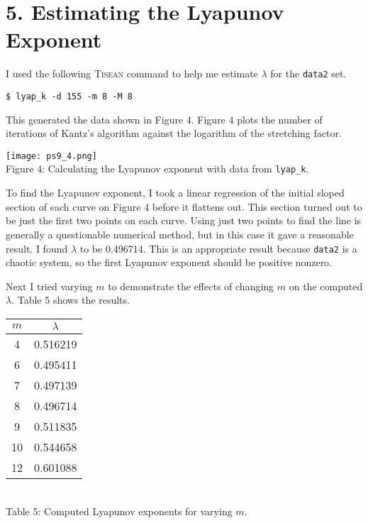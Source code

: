 \documentclass[12pt, letterpaper]{article}
\begin{document}
\section*{5. Estimating the Lyapunov Exponent}

I used the following \textsc{Tisean} command to help me estimate $\lambda$ for
the \texttt{data2} set.

\vspace{1em}
\texttt{\$ lyap\_k -d 155 -m 8 -M 8}
\vspace{1em}

This generated the data shown in Figure 4. Figure 4 plots the number of iterations
of Kantz's algorithm against the logarithm of the stretching factor.

\begin{center}
\texttt{[image: ps9\_4.png]}
\\
Figure 4: Calculating the Lyapunov exponent with data from \texttt{lyap\_k}.
\end{center}

To find the Lyapunov exponent, I took a linear regression of the initial sloped
section of each curve on Figure 4 before it flattens out. This section turned
out to be just the first two points on each curve. Using just two points to find
the line is generally a questionable numerical method, but in this case it gave
a reasonable result. I found $\lambda$ to be 0.496714. This is an appropriate 
result because \texttt{data2} is a chaotic system, so the first Lyapunov exponent
should be positive nonzero.

Next I tried varying $m$ to demonstrate the effects of changing $m$ on the 
computed $\lambda$. Table 5 shows the results.

\begin{center}
\begin{tabular}{c | c}
$m$ & $\lambda$ \\ \hline
4 & 0.516219 \\
6 & 0.495411 \\
7 & 0.497139 \\
8 & 0.496714 \\
9 & 0.511835 \\
10 & 0.544658 \\
12 & 0.601088
\end{tabular}
\\
\vspace{1em}
Table 5: Computed Lyapunov exponents for varying $m$.
\end{center}
\end{document}
